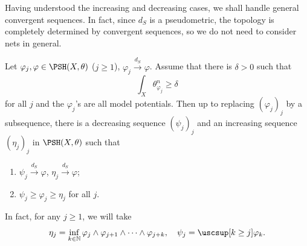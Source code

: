 Having understood the increasing and decreasing cases, we shall handle general convergent sequences. In fact, since $d_S$ is a pseudometric, the topology is completely determined by convergent sequences, so we do not need to consider nets in general.

\begin{proposition}\label{prop:incanddec}
    Let $\varphi_j,\varphi\in \PSH(X,\theta)$ ($j\geq 1$), $\varphi_j\xrightarrow{d_S}\varphi$. Assume that there is $\delta>0$ such that
    \[
    \int_X \theta_{\varphi_j}^n\geq \delta
    \]
    for all $j$ and the $\varphi_j$'s are all model potentials. Then up to replacing $(\varphi_j)_j$ by a subsequence, there is a decreasing sequence $(\psi_j)_j$ and an increasing sequence $(\eta_j)_j$ in $\PSH(X,\theta)$ such that
    \begin{enumerate}
        \item\label{itm:prop:incanddec:1} $\psi_j\xrightarrow{d_S}\varphi$, $\eta_j\xrightarrow{d_S}\varphi$;
        \item\label{itm:prop:incanddec:2} $\psi_j\geq \varphi_j\geq \eta_j$ for all $j$.
    \end{enumerate}
    In fact, for any $j\geq 1$, we will take
    \[
    \eta_j=\inf_{k\in \mathbb{N}}\varphi_j\land \varphi_{j+1}\land \cdots \land \varphi_{j+k},\quad
    \psi_j=\uscsup[k\geq j]\varphi_k.
    \]
\end{proposition}
